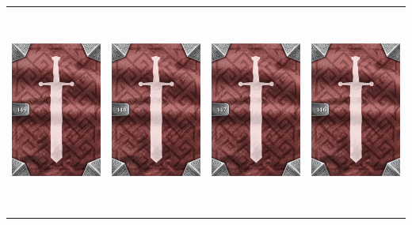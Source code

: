 \documentclass{minimal}
\begin{document}
{\begin{longtable}{llll}
\includegraphics[width=44mm,height=68mm]{./64-151/gh-149-elemental-boots-back.png} &
\includegraphics[width=44mm,height=68mm]{./64-151/gh-148-doctors-coat-back.png} &
\includegraphics[width=44mm,height=68mm]{./64-151/gh-147-cloak-of-the-hunter-back.png} &
\includegraphics[width=44mm,height=68mm]{./64-151/gh-146-masters-lute-back.png}\\ 
\end{longtable}}
\end{document}
